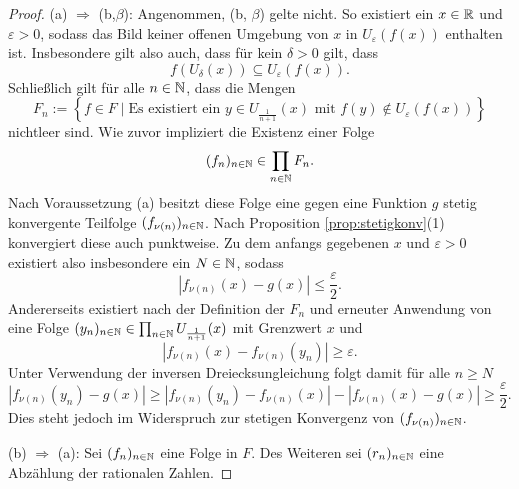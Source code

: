 \begin{proof}
  (a) $\Rightarrow$ (b,$\beta$):
  Angenommen, (b, $\beta$) gelte nicht.
  So existiert ein $x \in \mathbb{R}$ und $\varepsilon > 0$, sodass das Bild keiner offenen Umgebung von $x$ in $U_\varepsilon(f(x))$ enthalten ist.
  Insbesondere gilt also auch, dass für kein $\delta > 0$ gilt, dass
  \begin{displaymath}
    f(U_\delta(x)) \subseteq U_\varepsilon(f(x)).
  \end{displaymath}
  Schließlich gilt für alle $n \in \mathbb{N}$, dass die Mengen
  \begin{displaymath}
    F_n := \left\{ f \in F \mid \text{Es existiert ein } y \in U_{\frac{1}{n+1}}(x) \text{ mit } f(y) \not\in U_\varepsilon(f(x)) \right\}
  \end{displaymath}
  nichtleer sind.
  Wie zuvor impliziert \CCR die Existenz einer Folge 
  \begin{displaymath}
    (f_n)_{n \in \mathbb{N}} \in \prod_{n \in \mathbb{N}} F_n.
  \end{displaymath}
  Nach Voraussetzung (a) besitzt diese Folge eine gegen eine Funktion $g$ stetig konvergente Teilfolge $(f_{\nu(n)})_{n \in \mathbb{N}}$. 
  Nach Proposition \ref{prop:stetigkonv}(1) konvergiert diese auch punktweise.
  Zu dem anfangs gegebenen $x$ und $\varepsilon > 0$ existiert also insbesondere ein $N \in \mathbb{N}$, sodass
  \begin{displaymath}
    | f_{\nu(n)}(x) - g(x) | \leq \frac{\varepsilon}{2}.
  \end{displaymath}
  Andererseits existiert nach der Definition der $F_n$ und erneuter Anwendung von \CCR eine Folge $(y_n)_{n \in \mathbb{N}} \in \prod_{n \in \mathbb{N}} U_{\frac{1}{n+1}}(x)$ mit Grenzwert $x$ und
  \begin{displaymath}
    | f_{\nu(n)}(x) -  f_{\nu(n)}(y_n) | \geq \varepsilon.
  \end{displaymath}
  Unter Verwendung der inversen Dreiecksungleichung folgt damit für alle $n \geq N$
  \begin{displaymath}
    | f_{\nu(n)}(y_n) - g(x) | 
    \geq 
    | f_{\nu(n)}(y_n) - f_{\nu(n)}(x) | - | f_{\nu(n)}(x) - g(x)  | 
    \geq \frac{\varepsilon}{2}.
  \end{displaymath}
  Dies steht jedoch im Widerspruch zur stetigen Konvergenz von $(f_{\nu(n)})_{n \in \mathbb{N}}$.

  (b) $\Rightarrow$ (a):
  Sei $(f_n)_{n \in \mathbb{N}}$ eine Folge in $F$.
  Des Weiteren sei $(r_n)_{n \in \mathbb{N}}$ eine Abzählung der rationalen Zahlen.


\end{proof}
